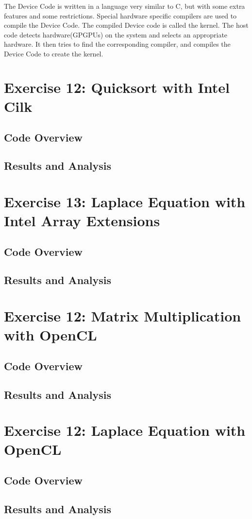 \documentclass[]{scrartcl}
\begin{document}
The Device Code is written in a language very similar to C, but with some extra features
and some restrictions. Special hardware specific compilers are used to compile the Device Code.
The compiled Device code is called the kernel. The host code detects hardware(GPGPUs) on the 
system and selects an appropriate hardware. It then tries to find the corresponding compiler,
and compiles the Device Code to create the kernel.

\pagebreak
\section{Exercise 12: Quicksort with Intel Cilk}

\subsection{Code Overview}

\subsection{Results and Analysis}

\pagebreak
\section{Exercise 13: Laplace Equation with Intel Array Extensions}

\subsection{Code Overview}

\subsection{Results and Analysis}

\pagebreak
\section{Exercise 12: Matrix Multiplication with OpenCL}

\subsection{Code Overview}

\subsection{Results and Analysis}

\pagebreak
\section{Exercise 12: Laplace Equation with OpenCL}

\subsection{Code Overview}

\subsection{Results and Analysis}
\end{document}
